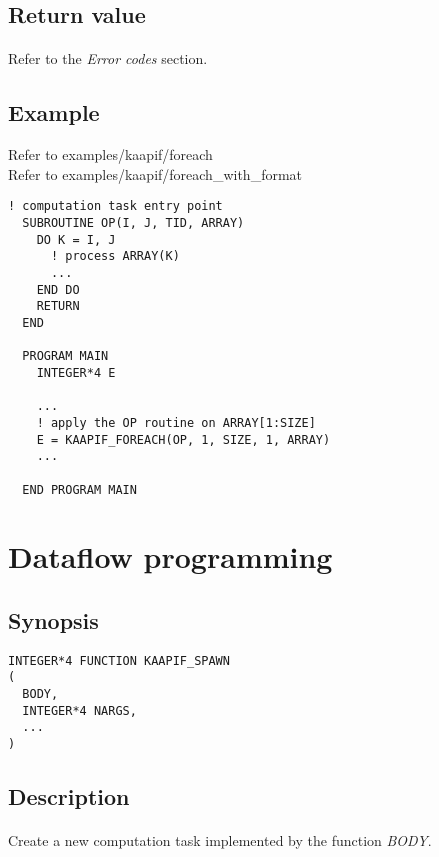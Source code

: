 \documentclass[a4paper, 11pt]{article}
\begin{document}
\subsection{Return value}
\paragraph{}
Refer to the \textit{Error codes} section.

\subsection{Example}
Refer to examples/kaapif/foreach\\
Refer to examples/kaapif/foreach\_with\_format

\begin{small}
\begin{lstlisting}[frame=tb]
  ! computation task entry point
  SUBROUTINE OP(I, J, TID, ARRAY)
    DO K = I, J
      ! process ARRAY(K)
      ...
    END DO
    RETURN
  END

  PROGRAM MAIN
    INTEGER*4 E

    ...
    ! apply the OP routine on ARRAY[1:SIZE]
    E = KAAPIF_FOREACH(OP, 1, SIZE, 1, ARRAY)
    ...

  END PROGRAM MAIN
\end{lstlisting}
\end{small}


\newpage
\section{Dataflow programming}
\subsection{Synopsis}
\begin{small}
\lstset{language=C}
\begin{lstlisting}[frame=tb]
INTEGER*4 FUNCTION KAAPIF_SPAWN
(
  BODY,
  INTEGER*4 NARGS,
  ...
)
\end{lstlisting}
\end{small}

\subsection{Description}
\paragraph{}
Create a new computation task implemented by the function \textit{BODY}.
\end{document}
